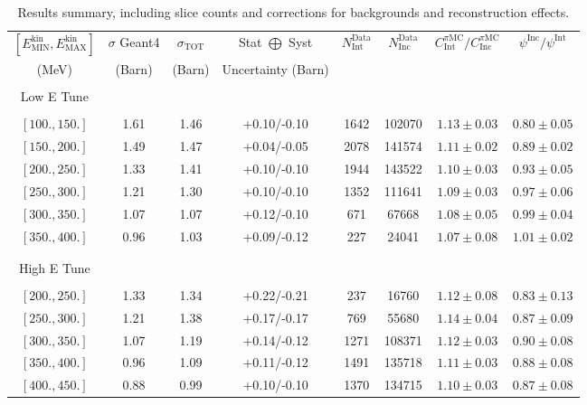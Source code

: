 \documentclass[%
 floatfix,
 reprint,
 twocolumn,
superscriptaddress,
showpacs,preprintnumbers,
 amsmath,amssymb,
 aps,
prd,
]{revtex4-1}
\begin{document}
\begin{table*}[p]
\caption{\label{tab:XSsummary} Results summary, including slice counts and corrections for backgrounds and reconstruction effects.} 
\begin{ruledtabular}
\begin{tabular}{cccccccc}
$[E^\text{kin}_{\text{MIN}}, E^\text{kin}_{\text{MAX}}]$& $\sigma$ Geant4  & $\sigma_{\text{TOT}}$ & Stat $\bigoplus$ Syst  & $N^{ \text{Data}}_{ \text{Int}}$
& $N^{ \text{Data}}_{ \text{Inc}}$ & $C^{\pi \text{MC}}_{\text{Int}} / C^{\pi \text{MC}}_{\text{Inc}}$ & $ \psi^{\text{Inc}}/\psi^{\text{Int}}$ \\ 
(MeV)& (Barn)& (Barn) & Uncertainty (Barn) & & & &  \\\hline
& & & & & & & \\
Low E Tune& & & & & & & \\
& & & & & & & \\
$[ 100. , 150. ]$& 1.61  & 1.46 &+0.10/-0.10 & 1642 & 102070 & $1.13 \pm 0.03$ & $0.80 \pm 0.05$\\
$[ 150. , 200. ]$& 1.49  & 1.47 &+0.04/-0.05 & 2078 & 141574 & $1.11 \pm 0.02$ & $0.89 \pm 0.02$\\
$[ 200. , 250. ]$& 1.33  & 1.41 &+0.10/-0.10 & 1944 & 143522 & $1.10 \pm 0.03$ & $0.93 \pm 0.05$\\
$[ 250. , 300. ]$& 1.21  & 1.30 &+0.10/-0.10 & 1352 & 111641 & $1.09 \pm 0.03$ & $0.97 \pm 0.06$\\
$[ 300. , 350. ]$& 1.07  & 1.07 &+0.12/-0.10 & 671  & 67668  & $1.08 \pm 0.05$ & $0.99 \pm 0.04$\\
$[ 350. , 400. ]$& 0.96  & 1.03 &+0.09/-0.12 & 227  & 24041  & $1.07 \pm 0.08$ & $1.01 \pm 0.02$\\
& & & & & & & \\
\hline
& & & & & & & \\
High E Tune & & & & & & & \\
& & & & & & & \\
$[ 200. , 250. ]$& 1.33  & 1.34 &+0.22/-0.21 &  237 & 16760  & $1.12 \pm 0.08$ & $0.83 \pm 0.13$ \\
$[ 250. , 300. ]$& 1.21  & 1.38 &+0.17/-0.17 &  769 & 55680  & $1.14 \pm 0.04$ & $0.87 \pm 0.09$ \\
$[ 300. , 350. ]$& 1.07  & 1.19 &+0.14/-0.12 & 1271 & 108371 & $1.12 \pm 0.03$ & $0.90 \pm 0.08$ \\
$[ 350. , 400. ]$& 0.96  & 1.09 &+0.11/-0.12 & 1491 & 135718 & $1.11 \pm 0.03$ & $0.88 \pm 0.08$ \\
$[ 400. , 450. ]$& 0.88  & 0.99 &+0.10/-0.10 & 1370 & 134715 & $1.10 \pm 0.03$ & $0.87 \pm 0.08$ \\

\end{tabular}
\end{ruledtabular}
\end{table*}
\end{document}
